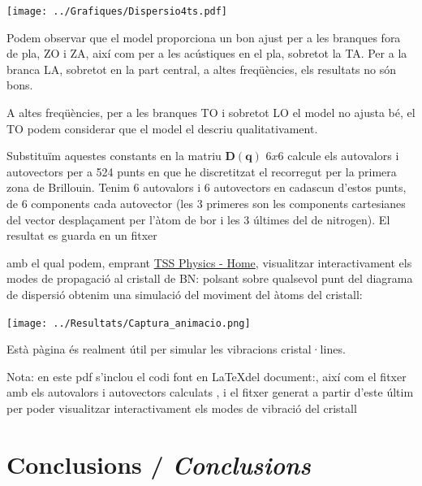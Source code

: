 \documentclass[12pt]{article} %
\let\vec\mathbf %
\begin{document}
{\begin{center}
\texttt{[image: ../Grafiques/Dispersio4ts.pdf]}
\end{center}


Podem observar que el model  proporciona un bon ajust per a les branques fora de pla, ZO i ZA, així com per a les acústiques en el pla, sobretot la TA. Per a la branca LA, sobretot en la part central, a altes freqüències, els resultats no són bons. 

A altes freqüències, per a les branques TO i sobretot LO el model no ajusta bé, el TO podem considerar que el model el descriu qualitativament.


Substituïm aquestes constants en la matriu $\vec D(\vec q)$ $6x6$ calcule els autovalors i autovectors per a 524 punts en que he discretitzat el recorregut per la primera zona de Brillouin. Tenim 6 autovalors i 6 autovectors en cadascun d'estos punts, de 6 components cada autovector (les 3 primeres son les components cartesianes del vector desplaçament per l'àtom de bor i les 3 últimes del de nitrogen). El resultat es guarda en un fitxer } amb el qual podem, emprant \href{https://henriquemiranda.github.io/phononwebsite/index.html}{TSS Physics - Home}, visualitzar interactivament els modes de propagació al cristall de BN: polsant sobre qualsevol punt del diagrama de dispersió obtenim una simulació del moviment del àtoms del cristall:

\begin{center}
 \texttt{[image: ../Resultats/Captura\_animacio.png]}
\end{center}

Està pàgina és realment útil per simular les vibracions cristal·lines.

\vspace{2cm}

Nota: en este pdf s'inclou el codi font en \LaTeX  del document:, així com el fitxer amb els autovalors i autovectors calculats , i el fitxer generat a partir d'este últim per poder visualitzar  interactivament els modes de vibració del cristall 

\section{Conclusions / \emph{Conclusions}}
\end{document}
